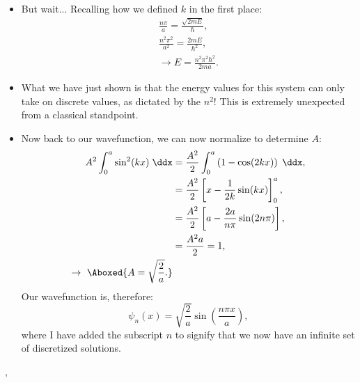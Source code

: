 \begin{itemize}
    \item But wait... Recalling how we defined $k$ in the first place:
        \begin{gather*}
            \frac{n\pi}{a} = \frac{\sqrt{2mE}}{\hbar}, \\
            \frac{n^2\pi^2}{a^2} = \frac{2mE}{\hbar^2}, \\
            \rightarrow \boxed{E = \frac{n^2\pi^2\hbar^2}{2ma}.}
        \end{gather*}
    \item What we have just shown is that the energy values for this system can only take on discrete values, as dictated by the $n^2$! This is extremely unexpected from a classical standpoint.
    \item Now back to our wavefunction, we can now normalize to determine $A$:
        \begin{align*}
            A^2 \int_0^a \sin^2(kx) \;\ddx &= \frac{A^2}{2} \int_0^a \left(1 - \cos(2kx)\right) \;\ddx, \\
            &= \frac{A^2}{2} \left[x - \frac{1}{2k}\sin(kx)\right]_0^a, \\
            &= \frac{A^2}{2} \left[a - \frac{2a}{n\pi}\sin(2n\pi)\right], \\
            &= \frac{A^2 a}{2} = 1, \\
            \rightarrow\ \Aboxed{A = \sqrt{\frac{2}{a}}.}
        \end{align*}
        Our wavefunction is, therefore:
        \begin{equation}
            \psi_n(x) = \sqrt{\frac{2}{a}} \sin\left(\frac{n\pi x}{a}\right),\label{InfSquareWellTISol}
        \end{equation}
        where I have added the subscript $n$ to signify that we now have an infinite set of discretized solutions.
\end{itemize}

\sep

